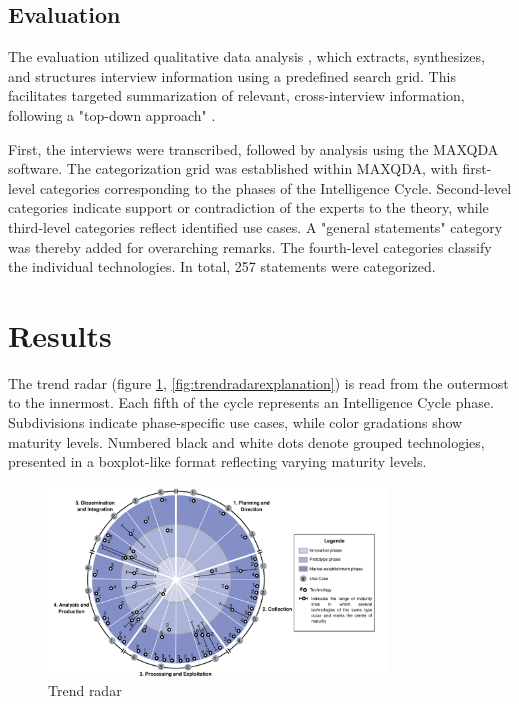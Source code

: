 \documentclass[10pt]{article}
\begin{document}
\subsection{Evaluation}

The evaluation utilized qualitative data analysis \cite{Glaser.2009}, which extracts, synthesizes, and structures interview information using a predefined search grid. This facilitates targeted summarization of relevant, cross-interview information, following a "top-down approach" \cite{Bogner.2014, Glaser.2009}.

First, the interviews were transcribed, followed by analysis using the MAXQDA software. The categorization grid was established within MAXQDA, with first-level categories corresponding to the phases of the Intelligence Cycle. Second-level categories indicate support or contradiction of the experts to the theory, while third-level categories reflect identified use cases. A "general statements" category was thereby added for overarching remarks. The fourth-level categories classify the individual technologies. In total, 257 statements were categorized.

\section{Results} \label{sec:results}

The trend radar (figure \ref{fig:trendradar}, \ref{fig:trendradarexplanation}) is read from the outermost to the innermost.
Each fifth of the cycle represents an Intelligence Cycle phase. Subdivisions indicate
phase-specific use cases, while color gradations show maturity levels. Numbered black
and white dots denote grouped technologies, presented in a boxplot-like format reflecting
varying maturity levels.

\begin{figure}[thb]
    \centering
    \includegraphics[width=0.8\textwidth]{PDF/images/crop_Trendradar}
    \caption{Trend radar}
    \label{fig:trendradar}
\end{figure}
\end{document}
